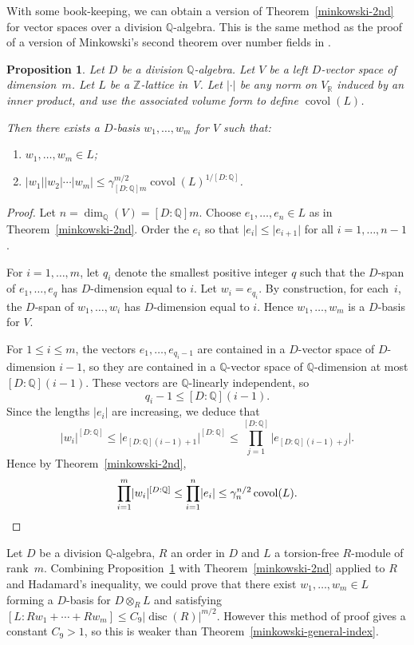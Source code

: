 \documentclass[11pt]{article}
\numberwithin{equation}{section}
\newenvironment{enumeratei}
{\bgroup\def\theenumi{\roman{enumi}}\def\theenumii{\alph{enumii}}\begin{enumerate}}
{\end{enumerate}\egroup}
\newcommand{\bQ}{\mathbb{Q}}
\newcommand{\bR}{\mathbb{R}}
\newcommand{\bZ}{\mathbb{Z}}
\DeclareMathOperator{\covol}{covol}
\DeclareMathOperator{\disc}{disc}
\newcommand{\abs}[1]{\lvert #1 \rvert}
\newtheorem{proposition}[lemma]{Proposition}
\begin{document}
With some book-keeping, we can obtain a version of Theorem~\ref{minkowski-2nd} for vector spaces over a division $\bQ$-algebra. This is the same method as the proof of a version of Minkowski's second theorem over number fields in \cite[C.2.18]{BG06}.

\begin{proposition} \label{D-minkowski}
Let $D$ be a division $\bQ$-algebra.
Let $V$ be a left $D$-vector space of dimension~$m$.
Let $L$ be a $\bZ$-lattice in~$V$.
Let $\abs{\cdot}$ be any norm on $V_\bR$ induced by an inner product, and use the associated volume form to define $\covol(L)$.

Then there exists a $D$-basis $w_1, \dotsc, w_m$ for $V$ such that:
\begin{enumeratei}
\item $w_1, \dotsc, w_m \in L$;
\item $\abs{w_1} \abs{w_2} \dotsm \abs{w_m} \leq \gamma_{[D:\bQ]m}^{m/2} \covol(L)^{1/[D:\bQ]}$.
\end{enumeratei}
\end{proposition}

\begin{proof}
Let $n = \dim_\bQ(V) = [D:\bQ]m$.
Choose $e_1, \dotsc, e_n \in L$ as in Theorem~\ref{minkowski-2nd}.
Order the $e_i$ so that $\abs{e_i} \leq \abs{e_{i+1}}$ for all $i = 1, \dotsc, n-1$.

For $i = 1, \dotsc, m$, let $q_i$ denote the smallest positive integer $q$ such that the $D$-span of $e_1, \dotsc, e_q$ has $D$-dimension equal to $i$.
Let $w_i = e_{q_i}$.
By construction, for each~$i$, the $D$-span of $w_1, \dotsc, w_i$ has $D$-dimension equal to $i$. Hence $w_1, \dotsc, w_m$ is a $D$-basis for $V$.

For $1 \leq i \leq m$, the vectors $e_1, \dotsc, e_{q_i-1}$ are contained in a $D$-vector space of $D$\nobreakdash-dimension $i-1$, so they are contained in a $\bQ$-vector space of $\bQ$-dimension at most $[D:\bQ](i-1)$. These vectors are $\bQ$-linearly independent, so
\[
q_i - 1 \leq [D:\bQ](i-1).
\]
Since the lengths $\abs{e_i}$ are increasing, we deduce that
\[
\abs{w_i}^{[D:\bQ]} \leq \abs{e_{[D:\bQ](i-1) + 1}}^{[D:\bQ]} \leq \prod_{j=1}^{[D:\bQ]} \abs{e_{[D:\bQ](i-1) + j}}.
\]
Hence by Theorem~\ref{minkowski-2nd},
\[
\prod_{i=1}^m \abs{w_i}^{[D:\bQ]} \leq \prod_{i=1}^n \abs{e_i} \leq \gamma_n^{n/2} \covol(L).
\qedhere
\]
\end{proof}

Let $D$ be a division $\bQ$-algebra, $R$ an order in $D$ and $L$ a torsion-free $R$-module of rank~$m$.
Combining Proposition~\ref{D-minkowski} with Theorem~\ref{minkowski-2nd} applied to $R$ and Hadamard's inequality, we could prove that there exist $w_1, \dotsc, w_m \in L$ forming a $D$-basis for $D \otimes_R L$ and satisfying $[L : Rw_1 + \dotsb + Rw_m] \leq C_{9} \abs{\disc(R)}^{m/2}$.
However this method of proof gives a constant $C_{9} > 1$, so this is weaker than Theorem~\ref{minkowski-general-index}.
\end{document}
